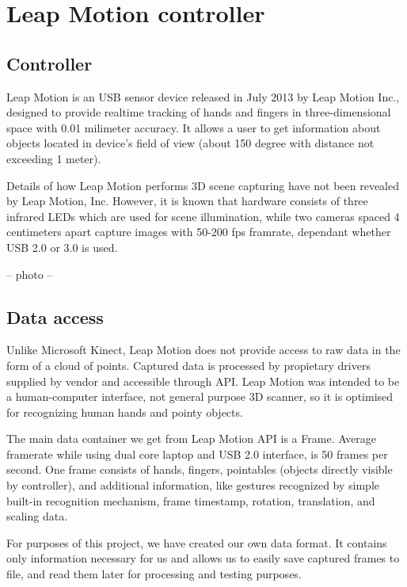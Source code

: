 \chapter{Leap Motion controller}

\section{Controller}
Leap Motion is an USB sensor device released in July 2013 by Leap Motion Inc., designed to provide realtime tracking of hands and fingers in three-dimensional space with 0.01 milimeter accuracy. It allows a user to get information about objects located in device's field of view (about 150 degree with distance not exceeding 1 meter).

Details of how Leap Motion performs 3D scene capturing have not been revealed by Leap Motion, Inc. However, it is known that hardware consists of three infrared LEDs which are used for scene illumination, while two cameras spaced 4 centimeters apart capture images with 50-200 fps framrate, dependant whether USB 2.0 or 3.0 is used.

-- photo -- 

\section{Data access}

Unlike Microsoft Kinect, Leap Motion does not provide access to raw data in the form of a cloud of points. Captured data is processed by propietary drivers supplied by vendor and accessible through API. Leap Motion was intended to be a human-computer interface, not general purpose 3D scanner, so it is optimised for recognizing human hands and pointy objects.

The main data container we get from Leap Motion API is a Frame. Average framerate while using dual core laptop and USB 2.0 interface, is 50 frames per second. One frame consists of hands, fingers, pointables (objects directly visible by controller), and additional information, like gestures recognized by simple built-in recognition mechanism, frame timestamp, rotation, translation, and scaling data. 

For purposes of this project, we have created our own data format. It contains only information necessary for us and allows us to easily save captured frames to file, and read them later for processing and testing purposes.